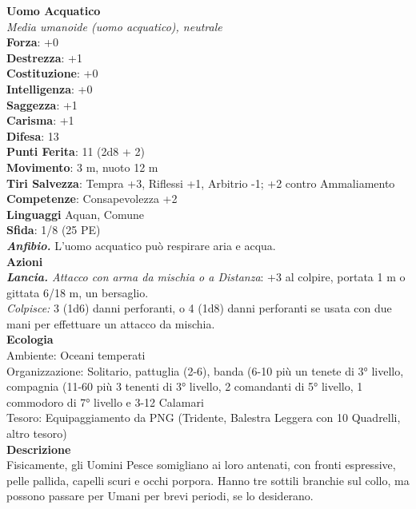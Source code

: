 \begin{multicols}{2}
\medskip\textbf{Uomo Acquatico}\\
\emph{Media umanoide (uomo acquatico), neutrale}\\
\textbf{Forza}: +0\\
\textbf{Destrezza}: +1\\
\textbf{Costituzione}: +0\\
\textbf{Intelligenza}: +0\\
\textbf{Saggezza}: +1\\
\textbf{Carisma}: +1\\
\textbf{Difesa}: 13\\
\textbf{Punti Ferita}: 11 (2d8 + 2)\\
\textbf{Movimento}: 3 m, nuoto 12 m\\
\textbf{Tiri Salvezza}:  Tempra +3, Riflessi +1, Arbitrio -1; +2 contro Ammaliamento\\
\textbf{Competenze}: Consapevolezza +2\\
\textbf{Linguaggi} Aquan, Comune\\
\textbf{Sfida}: 1/8 (25 PE)\smallskip\\
\emph{\textbf{Anfibio.}} L'uomo acquatico può respirare aria e acqua.\\
\smallskip\textbf{Azioni}\\
\emph{\textbf{Lancia.} Attacco con arma da mischia o a Distanza}: +3 al colpire, portata 1 m o gittata 6/18 m, un bersaglio.\\
\emph{Colpisce:} 3 (1d6) danni perforanti, o 4 (1d8) danni perforanti se usata con due mani per effettuare un attacco da mischia.\\
\textbf{Ecologia}\\
Ambiente: Oceani temperati\\
Organizzazione: Solitario, pattuglia (2-6), banda (6-10 più un tenete di 3° livello, compagnia (11-60 più 3 tenenti di 3° livello, 2 comandanti di 5° livello, 1 commodoro di 7° livello e 3-12 Calamari\\
Tesoro: Equipaggiamento da PNG (Tridente, Balestra Leggera con 10 Quadrelli, altro tesoro)\\
\textbf{Descrizione}\\
Fisicamente, gli Uomini Pesce somigliano ai loro antenati, con fronti espressive, pelle pallida, capelli scuri e occhi porpora. Hanno tre sottili branchie sul collo, ma possono passare per Umani per brevi periodi, se lo desiderano.\\


\end{multicols}
